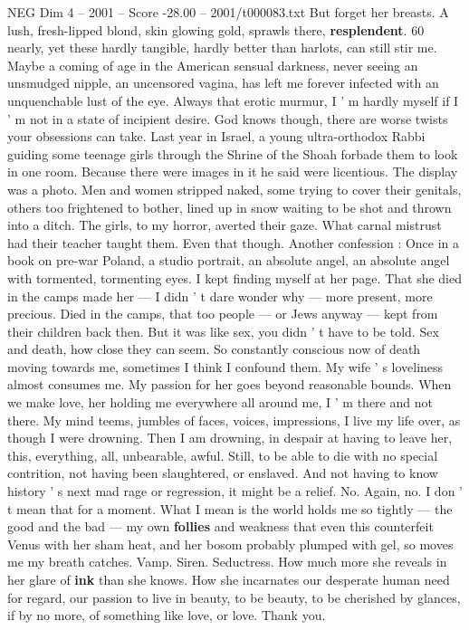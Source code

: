 \begin{textsample}{NEG Dim 4 – 2001 – Score -28.00 – 2001/t000083.txt}
But forget her breasts.
A lush, fresh-lipped blond, skin glowing gold, sprawls there, \textbf{resplendent}. 60 nearly, yet these hardly tangible, hardly better than harlots, can still stir me.
Maybe a coming of age in the American sensual darkness, never seeing an unsmudged nipple, an uncensored vagina, has left me forever infected with an unquenchable lust of the eye.
Always that erotic murmur, I ' m hardly myself if I ' m not in a state of incipient desire.
God knows though, there are worse twists your obsessions can take.
Last year in Israel, a young ultra-orthodox Rabbi guiding some teenage girls through the Shrine of the Shoah forbade them to look in one room.
Because there were images in it he said were licentious.
The display was a photo.
Men and women stripped naked, some trying to cover their genitals, others too frightened to bother, lined up in snow waiting to be shot and thrown into a ditch.
The girls, to my horror, averted their gaze.
What carnal mistrust had their teacher taught them.
Even that though.
Another confession : Once in a book on pre-war Poland, a studio portrait, an absolute angel, an absolute angel with tormented, tormenting eyes.
I kept finding myself at her page.
That she died in the camps made her — I didn ' t dare wonder why — more present, more precious.
Died in the camps, that too people — or Jews anyway — kept from their children back then.
But it was like sex, you didn ' t have to be told.
Sex and death, how close they can seem.
So constantly conscious now of death moving towards me, sometimes I think I confound them.
My wife ' s loveliness almost consumes me.
My passion for her goes beyond reasonable bounds.
When we make love, her holding me everywhere all around me, I ' m there and not there.
My mind teems, jumbles of faces, voices, impressions, I live my life over, as though I were drowning.
Then I am drowning, in despair at having to leave her, this, everything, all, unbearable, awful.
Still, to be able to die with no special contrition, not having been slaughtered, or enslaved.
And not having to know history ' s next mad rage or regression, it might be a relief.
No.
Again, no.
I don ' t mean that for a moment.
What I mean is the world holds me so tightly — the good and the bad — my own \textbf{follies} and weakness that even this counterfeit Venus with her sham heat, and her bosom probably plumped with gel, so moves me my breath catches.
Vamp.
Siren.
Seductress.
How much more she reveals in her glare of \textbf{ink} than she knows.
How she incarnates our desperate human need for regard, our passion to live in beauty, to be beauty, to be cherished by glances, if by no more, of something like love, or love.
Thank you.

\end{textsample}
